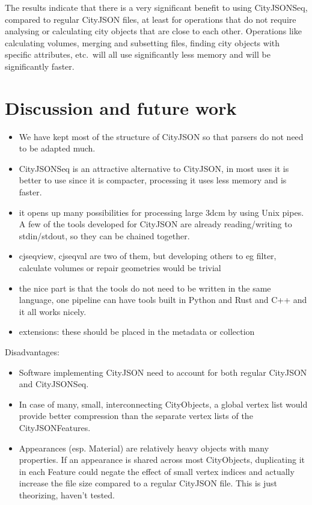 \documentclass{isprs} %
\begin{document}
The results indicate that there is a very significant benefit to using CityJSONSeq, compared to regular CityJSON files, at least for operations that do not require analysing or calculating city objects that are close to each other.
Operations like calculating volumes, merging and subsetting files, finding city objects with specific attributes, etc.\ will all use significantly less memory and will be significantly faster.


%
\section{Discussion and future work}%
\label{sec:discussion}

\begin{itemize}
  \item We have kept most of the structure of CityJSON so that parsers do not need to be adapted much.
  \item CityJSONSeq is an attractive alternative to CityJSON, in most uses it is better to use since it is compacter, processing it uses less memory and is faster.
  \item it opens up many possibilities for processing large 3dcm by using Unix pipes. A few of the tools developed for CityJSON are already reading/writing to stdin/stdout, so they can be chained together.
  \item cjseqview, cjseqval are two of them, but developing others to eg filter, calculate volumes or repair geometries would be trivial
  \item the nice part is that the tools do not need to be written in the same language, one pipeline can have tools built in Python and Rust and C++ and it all works nicely.
  \item extensions: these should be placed in the metadata or collection
\end{itemize}

Disadvantages:
\begin{itemize}
  \item  Software implementing CityJSON need to account for both regular CityJSON and CityJSONSeq.
  \item  In case of many, small, interconnecting CityObjects, a global vertex list would provide better compression than the separate vertex lists of the CityJSONFeatures.
  \item  Appearances (esp. Material) are relatively heavy objects with many properties. If an appearance is shared across most CityObjects, duplicating it in each Feature could negate the effect of small vertex indices and actually increase the file size compared to a regular CityJSON file. This is just theorizing, haven't tested.
\end{itemize}


{
	\begin{spacing}{1.17}
		\normalsize
	\end{spacing}
}
\end{document}
